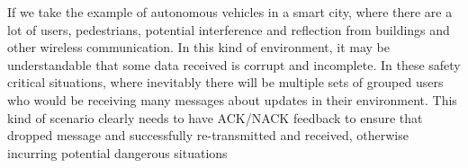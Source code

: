 \documentclass{article}
\begin{document}






If we take the example of autonomous vehicles in a smart city, where there are a lot of users, pedestrians, potential interference and reflection from buildings and other wireless communication. In this kind of environment, it may be understandable that some data received is corrupt and incomplete. In these safety critical situations, where inevitably there will be multiple sets of grouped users who would be receiving many messages about updates in their environment. This kind of scenario clearly needs to have ACK/NACK feedback to ensure that dropped message and successfully re-transmitted and received, otherwise incurring potential dangerous situations 

\end{document}
